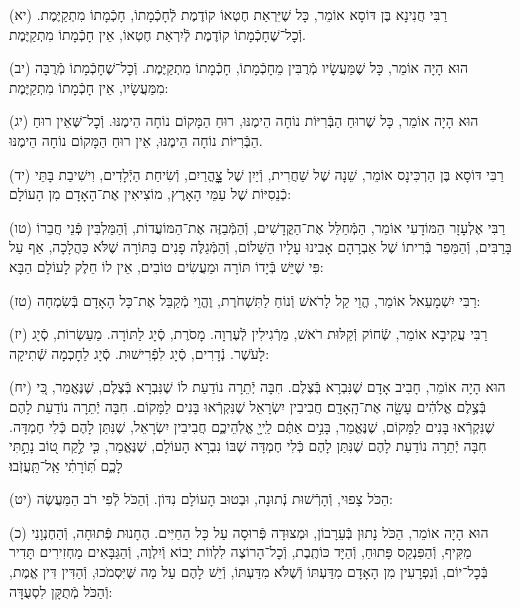 \documentclass[twoside, openany, parskip=half, 11pt]{book}
\begin{document}
(יא)
רַבִּי חֲנִינָא בֶּן דּוֹסָא אוֹמֵר, כָּל שֶׁיִּרְאַת חֶטְאוֹ קוֹדֶמֶת לְֿחָכְֿמָתוֹ, חָכְֿמָתוֹ מִתְקַיֶּמֶת.
וְֿכׇל־שֶׁחָכְֿמָתוֹ קוֹדֶמֶת לְֿיִרְאַת חֶטְאוֹ, אֵין חָכְֿמָתוֹ מִתְקַיֶּמֶת.

(יב)
הוּא הָיָה אוֹמֵר, כָּל שֶׁמַּעֲשָׂיו מְֿרֻבִּין מֵחָכְֿמָתוֹ, חָכְֿמָתוֹ מִתְקַיֶּמֶת.
וְֿכׇל־שֶׁחָכְֿמָתוֹ מְֿרֻבָּה מִמַּעֲשָׂיו, אֵין חָכְֿמָתוֹ מִתְקַיֶּמֶת:

(יג)
הוּא הָיָה אוֹמֵר, כָּל שֶׁרוּחַ הַבְּֿרִיּוֹת נוֹחָה הֵימֶנּוּ, רוּחַ הַמָּקוֹם נוֹחָה הֵימֶנּוּ.
וְֿכׇל־שֶּׁאֵין רוּחַ הַבְּֿרִיּוֹת נוֹחָה הֵימֶנּוּ, אֵין רוּחַ הַמָּקוֹם נוֹחָה הֵימֶנּוּ.

(יד)
רַבִּי דּוֹסָא בֶּן הַרְכִּינָס אוֹמֵר, שֵׁנָה שֶׁל שַׁחֲרִית, וְֿיַיִן שֶׁל צׇׇׇׇׇׇׇָהֳרַיִם, וְֿשִׂיחַת הַיְֿלָדִים, וִישִׁיבַת בָּתֵּי כְֿנֵסִיּוֹת שֶׁל עַמֵּי הָאָרֶץ, מוֹצִיאִין אֶת־הָאָדָם מִן הָעוֹלָם:

(טו)
רַבִּי אֶלְעָזָר הַמּוֹדָעִי אוֹמֵר, הַמְּֿחַלֵּל אֶת־הַקֳּדָשִׁים, וְֿהַמְּֿבַזֶּה אֶת־הַמּוֹעֲדוֹת, וְֿהַמַּלְבִּין פְּֿנֵי חֲבֵרוֹ בָּרַבִּים, וְֿהַמֵּפֵר בְּֿרִיתוֹ שֶׁל אַבְרָהָם אָבִינוּ עָלָיו הַשָּׁלוֹם, וְֿהַמְּֿגַלֶּה פָנִים בַּתּוֹרָה שֶׁלֹּא כַּהֲלָכָה, אַף עַל פִּי שֶׁיֵּשׁ בְּֿיָדוֹ תּוֹרָה וּמַעֲשִׂים טוֹבִים, אֵין לוֹ חֵלֶק לָעוֹלָם הַבָּא:

(טז)
רַבִּי יִשְׁמָעֵאל אוֹמֵר, הֱוֵי קַל לָרֹאשׁ וְֿנוֹחַ לַתִּשְׁחֹרֶת, וֶהֱוֵי מְֿקַבֵּל אֶת־כָּל הָאָדָם בְּֿשִׂמְחָה:

(יז)
רַבִּי עֲקִיבָא אוֹמֵר, שְֿׂחוֹק וְֿקַלּוּת רֹאשׁ, מֵרְֿגִילִין לְֿעֶרְוָה.
מָסֹרֶת, סְֿיָג לַתּוֹרָה.
מַעַשְׂרוֹת, סְֿיָג לָעֹשֶׁר.
נְֿדָרִים, סְֿיָג לִפְֿרִישׁוּת.
סְֿיָג לַחׇכְמָה שְֿׁתִיקָה:

(יח)
הוּא הָיָה אוֹמֵר, חָבִיב אָדָם שֶׁנִּבְרָא בְּֿצֶלֶם.
חִבָּה יְֿתֵרָה נוֹדַעַת לוֹ שֶׁנִּבְרָא בְּֿצֶלֶם, שֶׁנֶּאֱמַר, כִּ֚י בְּֿצֶ֣לֶם אֱלֹהִ֔ים עָשָׂ֖ה אֶת־הָֽאָדָֽם׃
חֲבִיבִין יִשְׂרָאֵל שֶׁנִּקְרְֿאוּ בָּנִים לַמָּקוֹם.
חִבָּה יְֿתֵרָה נוֹדַעַת לָהֶם שֶׁנִּקְרְֿאוּ בָּנִים לַמָּקוֹם, שֶׁנֶּאֱמַר, בָּנִ֣ים אַתֶּ֔ם לַֽייָ֖ אֱלֹֽהֵיכֶ֑ם
חֲבִיבִין יִשְׂרָאֵל, שֶׁנִּתַּן לָהֶם כְּֿלִי חֶמְדָּה.
חִבָּה יְֿתֵרָה נוֹדַעַת לָהֶם שֶׁנִּתַּן לָהֶם כְּֿלִי חֶמְדָּה שֶׁבּוֹ נִבְרָא הָעוֹלָם, שֶׁנֶּאֱמַר, כִּ֤י לֶ֣קַח ט֭וֹב נָתַ֣תִּי לָכֶ֑ם תּֽ֝וֹרָתִ֗י אַֽל־תַּֽעֲזֹֽבוּ׃

(יט)
הַכֹּל צָפוּי, וְֿהָרְֿשׁוּת נְֿתוּנָה, וּבְטוּב הָעוֹלָם נִדּוֹן.
וְֿהַכֹּל לְֿפִי רֹב הַמַּעֲשֶׂה:

(כ)
הוּא הָיָה אוֹמֵר, הַכֹּל נָתוּן בְּֿעֵרָבוֹן, וּמְצוּדָה פְּֿרוּסָה עַל כָּל הַחַיִּים.
הֶחָנוּת פְּֿתוּחָה, וְֿהַחֶנְוָנִי מַקִּיף, וְֿהַפִּנְקֵס פָּתוּחַ, וְֿהַיָּד כּוֹתֶֽבֶת, וְֿכׇל־הָרוֹצֶה לִלְווֹת יָבוֹא וְֿיִלְוֶה, וְֿהַגַּבָּאִים מַחְזִירִים תָּדִיר בְּֿכׇל־יוֹם, וְֿנִפְרָעִין מִן הָאָדָם מִדַּעְתּוֹ וְֿשֶׁלֹּא מִדַּעְתּוֹ, וְֿיֵשׁ לָהֶם עַל מַה שֶּׁיִּסְמֹכוּ, וְֿהַדִּין דִּין אֱמֶת, וְֿהַכֹּל מְֿתֻקָּן לִסְעֻדָּה:
\end{document}

